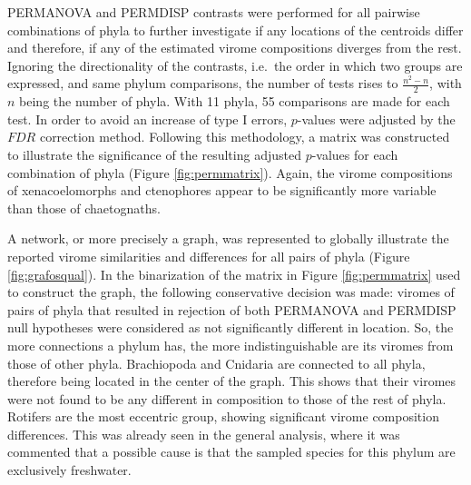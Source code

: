 \documentclass[
  openany]{book}
\begin{document}
PERMANOVA and PERMDISP contrasts were performed for all pairwise combinations of phyla to further investigate if any locations of the centroids differ and therefore, if any of the estimated virome compositions diverges from the rest. Ignoring the directionality of the contrasts, i.e.~the order in which two groups are expressed, and same phylum comparisons, the number of tests rises to \(\frac{n^2-n}{2}\), with \(n\) being the number of phyla. With 11 phyla, 55 comparisons are made for each test. In order to avoid an increase of type I errors, \(p\)-values were adjusted by the \(FDR\) correction method. Following this methodology, a matrix was constructed to illustrate the significance of the resulting adjusted \(p\)-values for each combination of phyla (Figure \ref{fig:permmatrix}). Again, the virome compositions of xenacoelomorphs and ctenophores appear to be significantly more variable than those of chaetognaths.

A network, or more precisely a graph, was represented to globally illustrate the reported virome similarities and differences for all pairs of phyla (Figure \ref{fig:grafosqual}). In the binarization of the matrix in Figure \ref{fig:permmatrix} used to construct the graph, the following conservative decision was made: viromes of pairs of phyla that resulted in rejection of both PERMANOVA and PERMDISP null hypotheses were considered as not significantly different in location. So, the more connections a phylum has, the more indistinguishable are its viromes from those of other phyla. Brachiopoda and Cnidaria are connected to all phyla, therefore being located in the center of the graph. This shows that their viromes were not found to be any different in composition to those of the rest of phyla. Rotifers are the most eccentric group, showing significant virome composition differences. This was already seen in the general analysis, where it was commented that a possible cause is that the sampled species for this phylum are exclusively freshwater.
\end{document}
